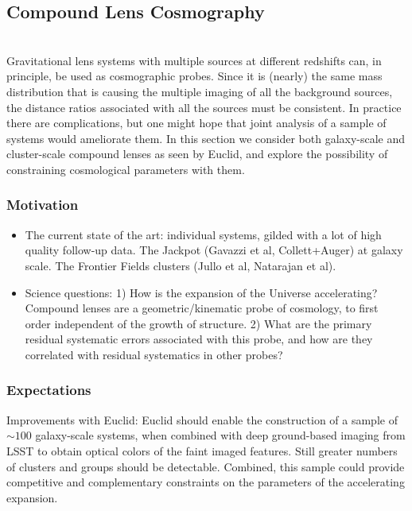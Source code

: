 \documentclass[twocolumn]{svjour3}
\begin{document}

\subsection{Compound Lens Cosmography}


\\

Gravitational lens systems with multiple sources at different redshifts can, in principle, be used as cosmographic probes. Since it is (nearly) the same mass distribution that is causing the multiple imaging of all the background sources, the distance ratios associated with all the sources must be consistent. In practice there are complications, but one might hope that joint analysis of a sample of systems would ameliorate them. In this section we consider both galaxy-scale and cluster-scale compound lenses as seen by Euclid, and explore the possibility of constraining cosmological parameters with them.

\subsubsection{Motivation}

\begin{itemize}
\item The current state of the art: individual systems, gilded with a lot of high quality follow-up data. The Jackpot (Gavazzi et al, Collett+Auger) at galaxy scale. The Frontier Fields clusters (Jullo et al, Natarajan et al).
\item Science questions: 1) How is the expansion of the Universe accelerating? Compound lenses are a geometric/kinematic probe of cosmology, to first order independent of the growth of structure. 2) What are the primary residual systematic errors associated with this probe, and how are they correlated with residual systematics in other probes?
\end{itemize}

\subsubsection{Expectations}

Improvements with Euclid: Euclid should enable the construction of a
sample of $\sim100$ galaxy-scale systems, when combined with deep
ground-based imaging from LSST to obtain optical colors of the faint
imaged features. Still greater numbers of clusters and groups should be
detectable. Combined, this sample could provide competitive and
complementary constraints on the parameters of the accelerating
expansion.
\end{document}

